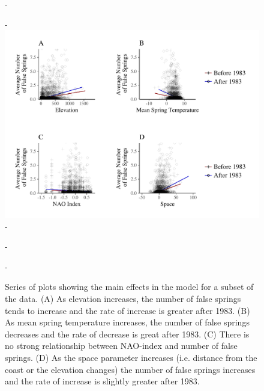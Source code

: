 \documentclass{article}\usepackage[]{graphicx}\usepackage[]{color}
\begin{document}
{\begin{figure} [H]
  -\begin{center}
  -\includegraphics[width=16cm]{..//figures/Main_sampleofdata.pdf}
  -\caption{Series of plots showing the main effects in the model for a subset of the data. (A) As elevation increases, the number of false springs tends to increase and the rate of increase is greater after 1983. (B) As mean spring temperature increases, the number of false springs decreases and the rate of decrease is great after 1983. (C) There is no strong relationship between NAO-index and number of false springs. (D) As the space parameter increases (i.e. distance from the coast or the elevation changes) the number of false springs increases and the rate of increase is slightly greater after 1983.}\label{fig:maineffects}
  -\end{center}
  -\end{figure}}
  
\end{document}
